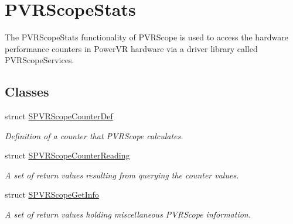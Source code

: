 \hypertarget{group___scope_stats}{\section{P\+V\+R\+Scope\+Stats}
\label{group___scope_stats}
}


The P\+V\+R\+Scope\+Stats functionality of P\+V\+R\+Scope is used to access the hardware performance counters in Power\+V\+R hardware via a driver library called P\+V\+R\+Scope\+Services.  


\subsection*{Classes}
\begin{DoxyCompactItemize}
\item 
struct \hyperlink{struct_s_p_v_r_scope_counter_def}{S\+P\+V\+R\+Scope\+Counter\+Def}
\begin{DoxyCompactList}\small\item\em Definition of a counter that P\+V\+R\+Scope calculates. \end{DoxyCompactList}\item 
struct \hyperlink{struct_s_p_v_r_scope_counter_reading}{S\+P\+V\+R\+Scope\+Counter\+Reading}
\begin{DoxyCompactList}\small\item\em A set of return values resulting from querying the counter values. \end{DoxyCompactList}\item 
struct \hyperlink{struct_s_p_v_r_scope_get_info}{S\+P\+V\+R\+Scope\+Get\+Info}
\begin{DoxyCompactList}\small\item\em A set of return values holding miscellaneous P\+V\+R\+Scope information. \end{DoxyCompactList}\end{DoxyCompactItemize}

